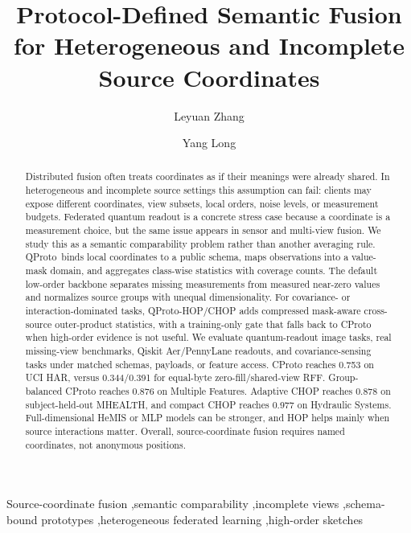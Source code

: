 \documentclass[preprint]{elsarticle}
\newcommand{\method}{QProto}
\newcommand{\hopmethod}{QProto-HOP}
\begin{document}
\begin{frontmatter}

\title{Protocol-Defined Semantic Fusion for Heterogeneous and Incomplete Source Coordinates}

\author[inst1]{Leyuan Zhang}
\author[inst1]{Yang Long}
\address[inst1]{Department of Computer Science, Durham University, Durham, United Kingdom}

\begin{abstract}
Distributed fusion often treats coordinates as if their meanings were already shared. In heterogeneous and incomplete source settings this assumption can fail: clients may expose different coordinates, view subsets, local orders, noise levels, or measurement budgets. Federated quantum readout is a concrete stress case because a coordinate is a measurement choice, but the same issue appears in sensor and multi-view fusion. We study this as a semantic comparability problem rather than another averaging rule. \method\ binds local coordinates to a public schema, maps observations into a value-mask domain, and aggregates class-wise statistics with coverage counts. The default low-order backbone separates missing measurements from measured near-zero values and normalizes source groups with unequal dimensionality. For covariance- or interaction-dominated tasks, \hopmethod/CHOP adds compressed mask-aware cross-source outer-product statistics, with a training-only gate that falls back to CProto when high-order evidence is not useful. We evaluate quantum-readout image tasks, real missing-view benchmarks, Qiskit Aer/PennyLane readouts, and covariance-sensing tasks under matched schemas, payloads, or feature access. CProto reaches 0.753 on UCI HAR, versus 0.344/0.391 for equal-byte zero-fill/shared-view RFF. Group-balanced CProto reaches 0.876 on Multiple Features. Adaptive CHOP reaches 0.878 on subject-held-out MHEALTH, and compact CHOP reaches 0.977 on Hydraulic Systems. Full-dimensional HeMIS or MLP models can be stronger, and HOP helps mainly when source interactions matter. Overall, source-coordinate fusion requires named coordinates, not anonymous positions.
\end{abstract}

\begin{keyword}
Source-coordinate fusion \sep semantic comparability \sep incomplete views \sep schema-bound prototypes \sep heterogeneous federated learning \sep high-order sketches
\end{keyword}

\end{frontmatter}










\FloatBarrier


\end{document}
